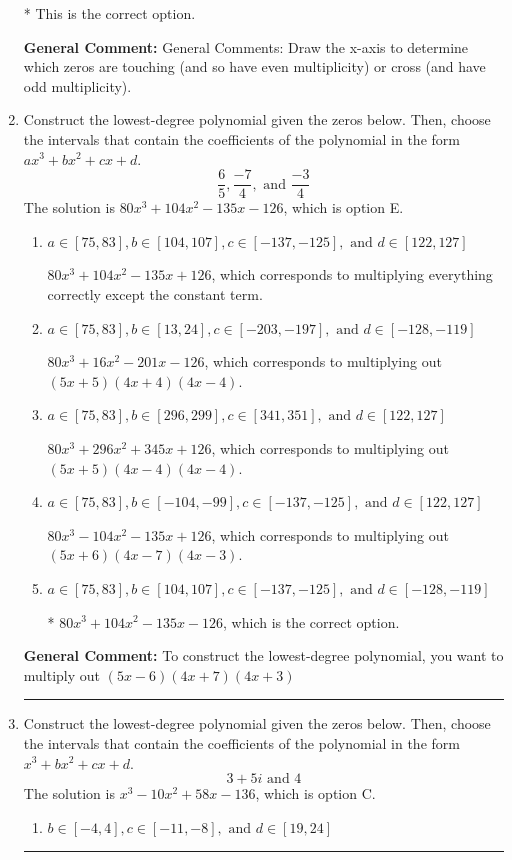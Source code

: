 \documentclass{extbook}[14pt]
\newcommand{\litem}[1]{\item #1

\rule{\textwidth}{0.4pt}}
\begin{document}
\begin{enumerate}
{\begin{enumerate}[label=\Alph*.]
* This is the correct option.
\end{enumerate}

\textbf{General Comment:} General Comments: Draw the x-axis to determine which zeros are touching (and so have even multiplicity) or cross (and have odd multiplicity).
}
\litem{
Construct the lowest-degree polynomial given the zeros below. Then, choose the intervals that contain the coefficients of the polynomial in the form $ax^3+bx^2+cx+d$.
\[ \frac{6}{5}, \frac{-7}{4}, \text{ and } \frac{-3}{4} \]
The solution is \( 80x^{3} +104 x^{2} -135 x -126 \), which is option E.\begin{enumerate}[label=\Alph*.]
\item \( a \in [75, 83], b \in [104, 107], c \in [-137, -125], \text{ and } d \in [122, 127] \)

$80x^{3} +104 x^{2} -135 x + 126$, which corresponds to multiplying everything correctly except the constant term.
\item \( a \in [75, 83], b \in [13, 24], c \in [-203, -197], \text{ and } d \in [-128, -119] \)

$80x^{3} +16 x^{2} -201 x -126$, which corresponds to multiplying out $(5x + 5)(4x + 4)(4x -4)$.
\item \( a \in [75, 83], b \in [296, 299], c \in [341, 351], \text{ and } d \in [122, 127] \)

$80x^{3} +296 x^{2} +345 x + 126$, which corresponds to multiplying out $(5x + 5)(4x -4)(4x -4)$.
\item \( a \in [75, 83], b \in [-104, -99], c \in [-137, -125], \text{ and } d \in [122, 127] \)

$80x^{3} -104 x^{2} -135 x + 126$, which corresponds to multiplying out $(5x + 6)(4x -7)(4x -3)$.
\item \( a \in [75, 83], b \in [104, 107], c \in [-137, -125], \text{ and } d \in [-128, -119] \)

* $80x^{3} +104 x^{2} -135 x -126$, which is the correct option.
\end{enumerate}

\textbf{General Comment:} To construct the lowest-degree polynomial, you want to multiply out $(5x -6)(4x + 7)(4x + 3)$
}
\litem{
Construct the lowest-degree polynomial given the zeros below. Then, choose the intervals that contain the coefficients of the polynomial in the form $x^3+bx^2+cx+d$.
\[ 3 + 5 i \text{ and } 4 \]
The solution is \( x^{3} -10 x^{2} +58 x -136 \), which is option C.\begin{enumerate}[label=\Alph*.]
\item \( b \in [-4, 4], c \in [-11, -8], \text{ and } d \in [19, 24] \)


\end{enumerate}}
\end{enumerate}
\end{document}
